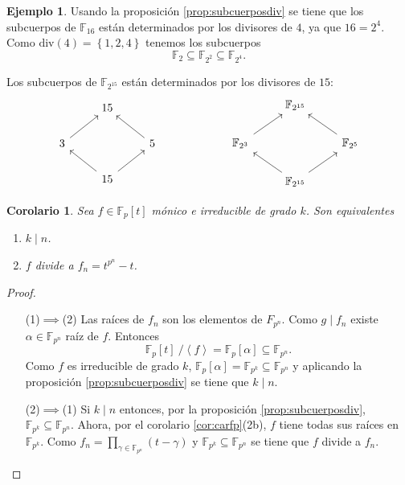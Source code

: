 \documentclass[10pt, spanish]{report}
\newtheorem{cor}{Corolario}[tma]
\theoremstyle{definition}
\newtheorem*{ej}{Ejemplo}
\newcommand{\F}{\mathbb{F}}
\newcommand{\fecha}[1]{\marginpar{\underline{\footnotesize{#1}}}}
\begin{document}
\fecha{23/03} %

\begin{ej}
    Usando la proposición \ref{prop:subcuerposdiv} se tiene que los subcuerpos
    de $\F_{16}$ están determinados por los divisores de $4$, ya que $16=2^4$.
    Como $\text{div}(4)=\left\{ 1,2,4 \right\}$ tenemos los subcuerpos
    \[\F_2\subseteq\F_{2^2}\subseteq\F_{2^4}.\]

    Los subcuerpos de $\F_{2^{15}}$ están determinados por los divisores de
    $15$:\[\begin{tikzcd}
              & 15               & \\
        3 \ar[ur] &                  & 5 \ar[ul] \\
                  & 15\ar[ul]\ar[ur] &
    \end{tikzcd}\hspace{6em}
    \begin{tikzcd}
              & \F_{2^{15}}              & \\
        \F_{2^3} \ar[ur] &                  & \F_{2^5} \ar[ul] \\
                         & \F_{2^{15}}\ar[ul]\ar[ur] &
    \end{tikzcd}\]
\end{ej}

\begin{cor}
    Sea $f\in\F_p[t]$ mónico e irreducible de grado $k$. Son equivalentes
    \begin{enumerate}
        \item $k\mid n$.
        \item $f$ divide a $f_n = t^{p^n}-t$.
    \end{enumerate}
\end{cor}

\begin{proof}
    \hspace{0pt}
    \begin{itemize}[itemindent=36pt]
        \item[(1)$\implies$(2)] Las raíces de $f_n$ son los elementos de
            $F_{p^n}$. Como $g\mid f_n$ existe $\alpha\in\F_{p^n}$ raíz de $f$.
            Entonces \[\F_p[t]\ /\left<f\right>=\F_p[\alpha]\subseteq\F_{p^n}.\]
            Como $f$ es irreducible de grado $k$,
            $\F_p[\alpha]=\F_{p^k}\subseteq \F_{p^n}$ y aplicando la
            proposición \ref{prop:subcuerposdiv} se tiene que $k\mid n$.
        \item[(2)$\implies$(1)] Si $k\mid n$ entonces, por la
            proposición \ref{prop:subcuerposdiv}, $\F_{p^k}\subseteq\F_{p^n}$.
            Ahora, por el corolario \ref{cor:carfp}(2b), $f$ tiene todas sus
            raíces en $\F_{p^k}$. Como $f_n=\prod_{\gamma\in\F_{p^n}}(t-\gamma)$
            y $\F_{p^k}\subseteq\F_{p^n}$ se tiene  que $f$ divide a $f_n$.
    \end{itemize}
\end{proof}
\end{document}
